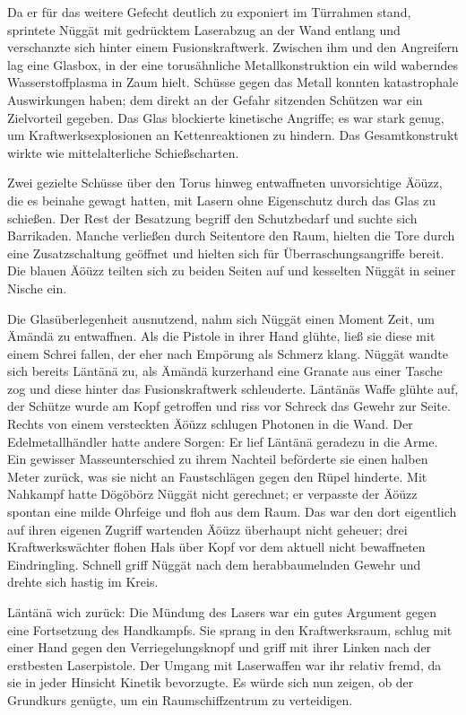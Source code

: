Da er für das weitere Gefecht deutlich zu exponiert im Türrahmen stand, sprintete Nüggät mit gedrücktem Laserabzug an der Wand entlang und verschanzte sich hinter einem Fusionskraftwerk. Zwischen ihm und den Angreifern lag eine Glasbox, in der eine torusähnliche Metallkonstruktion ein wild waberndes Wasserstoffplasma in Zaum hielt. Schüsse gegen das Metall konnten katastrophale Auswirkungen haben; dem direkt an der Gefahr sitzenden Schützen war ein Zielvorteil gegeben. Das Glas blockierte kinetische Angriffe; es war stark genug, um Kraftwerksexplosionen an Kettenreaktionen zu hindern. Das Gesamtkonstrukt wirkte wie mittelalterliche Schießscharten.

Zwei gezielte Schüsse über den Torus hinweg entwaffneten unvorsichtige Äöüzz, die es beinahe gewagt hatten, mit Lasern ohne Eigenschutz durch das Glas zu schießen. Der Rest der Besatzung begriff den Schutzbedarf und suchte sich Barrikaden. Manche verließen durch Seitentore den Raum, hielten die Tore durch eine Zusatzschaltung geöffnet und hielten sich für Überraschungsangriffe bereit. Die blauen Äöüzz teilten sich zu beiden Seiten auf und kesselten Nüggät in seiner Nische ein.

Die Glasüberlegenheit ausnutzend, nahm sich Nüggät einen Moment Zeit, um Ämändä zu entwaffnen. Als die Pistole in ihrer Hand glühte, ließ sie diese mit einem Schrei fallen, der eher nach Empörung als Schmerz klang. Nüggät wandte sich bereits Läntänä zu, als Ämändä kurzerhand eine Granate aus einer Tasche zog und diese hinter das Fusionskraftwerk schleuderte. Läntänäs Waffe glühte auf, der Schütze wurde am Kopf getroffen und riss vor Schreck das Gewehr zur Seite. Rechts von einem versteckten Äöüzz schlugen Photonen in die Wand. Der Edelmetallhändler hatte andere Sorgen: Er lief Läntänä geradezu in die Arme. Ein gewisser Masseunterschied zu ihrem Nachteil beförderte sie einen halben Meter zurück, was sie nicht an Faustschlägen gegen den Rüpel hinderte. Mit Nahkampf hatte Dögöbörz Nüggät nicht gerechnet; er verpasste der Äöüzz spontan eine milde Ohrfeige und floh aus dem Raum. Das war den dort eigentlich auf ihren eigenen Zugriff wartenden Äöüzz überhaupt nicht geheuer; drei Kraftwerkswächter flohen Hals über Kopf vor dem aktuell nicht bewaffneten Eindringling. Schnell griff Nüggät nach dem herabbaumelnden Gewehr und drehte sich hastig im Kreis.

Läntänä wich zurück: Die Mündung des Lasers war ein gutes Argument gegen eine Fortsetzung des Handkampfs. Sie sprang in den Kraftwerksraum, schlug mit einer Hand gegen den Verriegelungsknopf und griff mit ihrer Linken nach der erstbesten Laserpistole. Der Umgang mit Laserwaffen war ihr relativ fremd, da sie in jeder Hinsicht Kinetik bevorzugte. Es würde sich nun zeigen, ob der Grundkurs genügte, um ein Raumschiffzentrum zu verteidigen.

